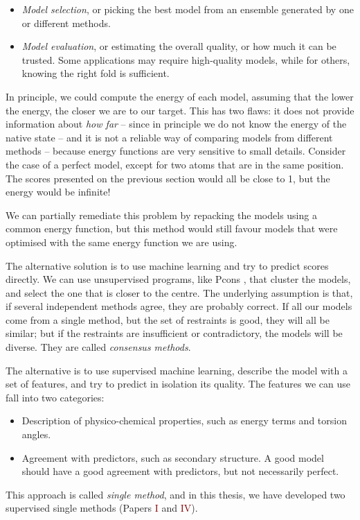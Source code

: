 \begin{itemize}
\item \emph{Model selection}, or picking the best model from an ensemble generated by one or different methods.
\item \emph{Model evaluation}, or estimating the overall quality, or how much it can be trusted.
Some applications may require high-quality models, while for others, knowing the right fold is sufficient.
\end{itemize}

In principle,  we could compute the energy of each model, assuming that the lower the energy, the closer we are to our target.
This has two flaws: it does not provide information about \emph{how far} -- since in principle we do not know the energy of the native state -- and it is not a reliable way of comparing models from different methods -- because energy functions are very sensitive to small details.
Consider the case of a perfect model, except for two atoms that are in the same position.
The scores presented on the previous section would all be close to 1, but the energy would be infinite!

We can partially remediate this problem by repacking the models using a common energy function, but this method would still favour models that were optimised with the same energy function we are using.


The alternative solution is to use machine learning and try to predict scores directly.
We can use unsupervised programs, like Pcons \citep{pcons}, that cluster the models, and select the one that is closer to the centre.
The underlying assumption is that, if several independent methods agree, they are probably correct.
If all our models come from a single method, but the set of restraints is good, they will all be similar; but if the restraints are insufficient or contradictory, the models will be diverse.
They are called \emph{consensus methods}.

The alternative is to use supervised machine learning,
describe the model with a set of features, and try to predict in isolation its quality.
The features we can use fall into two categories:

\begin{itemize}
\item Description of physico-chemical properties, such as energy terms and torsion angles.
\item Agreement with predictors, such as secondary structure. A good model should have a good agreement with predictors, but not necessarily perfect.
\end{itemize}

This approach is called \emph{single method}, and in this thesis, we have developed two supervised single methods (Papers \textcolor{Maroon}{I} and \textcolor{Maroon}{IV}).

